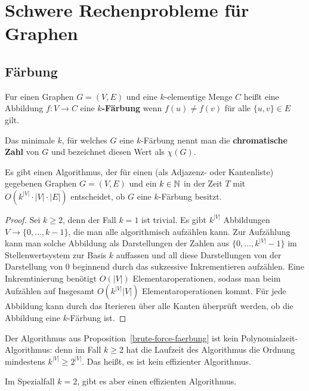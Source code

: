 \section{Schwere Rechenprobleme für Graphen} 

\subsection{Färbung} 

\begin{defn}
	Fur einen Graphen $ G = (V,E)$ und eine $k$-elementige Menge $C$ heißt eine Abbildung $ f : V\to C$ eine \textbf{$k$-Färbung} wenn $f(u) \ne f(v)$ für alle $\{u,v\} \in E$ gilt. 
	
	Das minimale $k$, für welches $G$ eine $k$-Färbung nennt man die \textbf{chromatische Zahl} von $G$ und bezeichnet diesen Wert als $\chi(G)$. 
\end{defn} 

\begin{prop} \label{brute-force-faerbung}
	Es gibt einen Algorithmus, der für einen (als Adjazenz- oder Kantenliste) gegebenen Graphen $G=(V,E)$ und ein $k \in \mathbb{N}$ in der Zeit $T$ mit $O(k^{|V|} \cdot |V| \cdot |E|)$ entscheidet, ob $G$ eine $k$-Färbung besitzt. 
\end{prop} 
\begin{proof} 
	Sei $k \ge 2$, denn der Fall $k=1$ ist trivial. 
	Es gibt $k^{|V|}$ Abbildungen $V \to \{0,\ldots,k-1\}$, die man alle algorithmisch aufzählen kann. Zur Aufzählung kann man solche Abbildung als Darstellungen der Zahlen aus $\{0,\ldots,k^{|V|} -1\}$ im Stellenwertsystem zur Basis $k$ auffassen und all diese Darstellungen von der Darstellung von $0$ beginnend durch das sukzessive Inkrementieren aufzählen. Eine Inkremtinierung benötigt $O(|V|)$ Elementaroperationen, sodass man beim Aufzählen auf Insgesamt $O(k^{|V|} |V|)$ Elementaroperationen kommt. Für jede Abbildung kann durch das Iterieren über alle Kanten überprüft werden, ob die Abbildung eine $k$-Färbung ist. 
\end{proof} 


\begin{bem}
	Der Algorithmus aus Proposition~\ref{brute-force-faerbung} ist kein Polynomialzeit-Algorithmus: denn im Fall $k \ge 2$ hat die Laufzeit des Algorithmus die Ordnung mindestens $
k^|V| \ge  2^{|V|}$. Das heißt, es ist kein effizienter Algorithmus. 
	
	Im Spezialfall $k=2$, gibt es aber einen effizienten Algorithmus.
\end{bem} 

